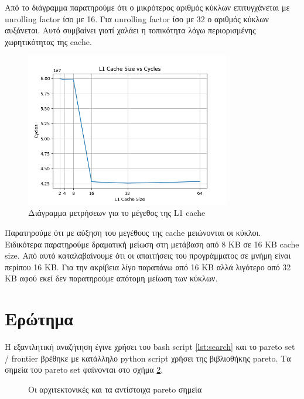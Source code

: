 \documentclass{article}
\newcommand{\eng}[1]{\foreignlanguage{english}{#1}} %
\begin{document}
Από το διάγραμμα παρατηρούμε ότι ο μικρότερος αριθμός κύκλων επιτυγχάνεται με \eng{unrolling factor} ίσο με 16. Για \eng{unrolling factor} ίσο με 32 ο αριθμός κύκλων αυξάνεται. Αυτό συμβαίνει γιατί χαλάει η τοπικότητα λόγω περιορισμένης χωρητικότητας της \eng{cache}.

\begin{figure}[h]
    \centering
    \includegraphics[width=0.8\textwidth]{./plots/l1-cache.png}
    \caption{Διάγραμμα μετρήσεων για το μέγεθος της \eng{L1 cache}}
    \label{fig:l1}
\end{figure}
\FloatBarrier

Παρατηρούμε ότι με αύξηση του μεγέθους της \eng{cache} μειώνονται οι κύκλοι. Ειδικότερα παρατηρούμε δραματική μείωση στη μετάβαση από 8 ΚΒ σε 16 ΚΒ cache size. Από αυτό καταλαβαίνουμε ότι οι απαιτήσεις του προγράμματος σε μνήμη είναι περίπου 16 ΚΒ. Για την ακρίβεια λίγο παραπάνω από 16 ΚΒ αλλά λιγότερο από 32 ΚΒ αφού εκεί δεν παρατηρούμε απότομη μείωση των κύκλων.

\section{Ερώτημα}

Η εξαντλητική αναζήτηση έγινε χρήσει του \eng{bash script} \ref{lst:search} και
το \eng{pareto set / frontier} βρέθηκε με κατάλληλο \eng{python script}
χρήσει της βιβλιοθήκης \eng{pareto}. Τα σημεία του \eng{pareto set} φαίνονται
στο σχήμα \ref{fig:pareto}.

\begin{figure}[h]
    
    \caption{Οι αρχιτεκτονικές και τα αντίστοιχα \eng{pareto} σημεία}
    \label{fig:pareto}
\end{figure}
\end{document}
